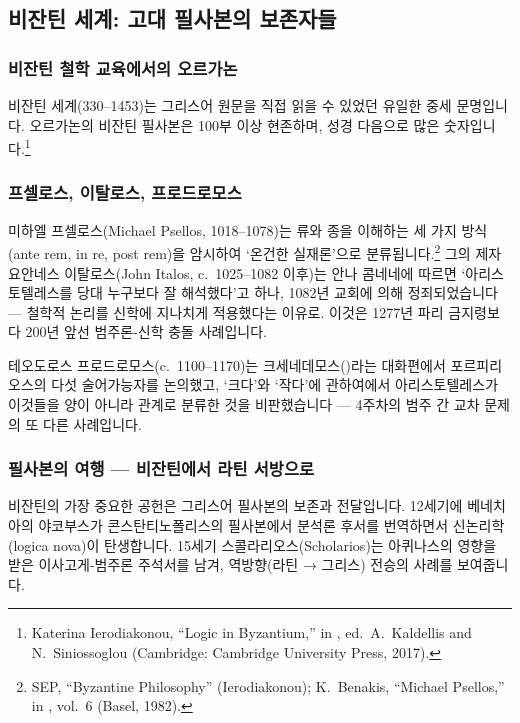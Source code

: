 \documentclass[12pt, a4paper]{article}
\begin{document}
\subsection{비잔틴 세계: 고대 필사본의 보존자들}

\subsubsection{비잔틴 철학 교육에서의 오르가논}

비잔틴 세계(330--1453)는 그리스어 원문을 직접 읽을 수 있었던 유일한 중세 문명입니다. 오르가논의 비잔틴 필사본은 100부 이상 현존하며, 성경 다음으로 많은 숫자입니다.\footnote{Katerina Ierodiakonou, ``Logic in Byzantium,'' in , ed.\ A.\ Kaldellis and N.\ Siniossoglou (Cambridge: Cambridge University Press, 2017).}

\subsubsection{프셀로스, 이탈로스, 프로드로모스}

미하엘 프셀로스(Michael Psellos, 1018--1078)는 류와 종을 이해하는 세 가지 방식(ante rem, in re, post rem)을 암시하여 `온건한 실재론'으로 분류됩니다.\footnote{SEP, ``Byzantine Philosophy'' (Ierodiakonou); K.\ Benakis, ``Michael Psellos,'' in , vol.\ 6 (Basel, 1982).} 그의 제자 요안네스 이탈로스(John Italos, c.\ 1025--1082 이후)는 안나 콤네네에 따르면 `아리스토텔레스를 당대 누구보다 잘 해석했다'고 하나, 1082년 교회에 의해 정죄되었습니다 --- 철학적 논리를 신학에 지나치게 적용했다는 이유로. 이것은 1277년 파리 금지령보다 200년 앞선 범주론-신학 충돌 사례입니다.

테오도로스 프로드로모스(c.\ 1100--1170)는 크세네데모스()라는 대화편에서 포르피리오스의 다섯 술어가능자를 논의했고, `크다'와 `작다'에 관하여에서 아리스토텔레스가 이것들을 양이 아니라 관계로 분류한 것을 비판했습니다 --- 4주차의 범주 간 교차 문제의 또 다른 사례입니다.

\subsubsection{필사본의 여행 --- 비잔틴에서 라틴 서방으로}

비잔틴의 가장 중요한 공헌은 그리스어 필사본의 보존과 전달입니다. 12세기에 베네치아의 야코부스가 콘스탄티노폴리스의 필사본에서 분석론 후서를 번역하면서 신논리학(logica nova)이 탄생합니다. 15세기 스콜라리오스(Scholarios)는 아퀴나스의 영향을 받은 이사고게-범주론 주석서를 남겨, 역방향(라틴 → 그리스) 전승의 사례를 보여줍니다.
\end{document}
